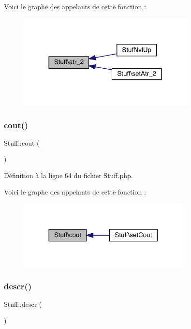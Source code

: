 Voici le graphe des appelants de cette fonction \+:\nopagebreak
\begin{figure}[H]
\begin{center}
\leavevmode
\includegraphics[width=254pt]{class_stuff_a1bb01959da153fe1aacf0b3fe5454756_icgraph}
\end{center}
\end{figure}
\mbox{\label{class_stuff_a3a67cfe36aa054dfc42f99a6883bb408}} 
\subsubsection{\texorpdfstring{cout()}{cout()}}
{\footnotesize\ttfamily Stuff\+::cout (\begin{DoxyParamCaption}{ }\end{DoxyParamCaption})}



Définition à la ligne 64 du fichier Stuff.\+php.

Voici le graphe des appelants de cette fonction \+:\nopagebreak
\begin{figure}[H]
\begin{center}
\leavevmode
\includegraphics[width=248pt]{class_stuff_a3a67cfe36aa054dfc42f99a6883bb408_icgraph}
\end{center}
\end{figure}
\mbox{\label{class_stuff_a1b91ba84e3eb06abc49dc61810f97454}} 
\subsubsection{\texorpdfstring{descr()}{descr()}}
{\footnotesize\ttfamily Stuff\+::descr (\begin{DoxyParamCaption}{ }\end{DoxyParamCaption})}



